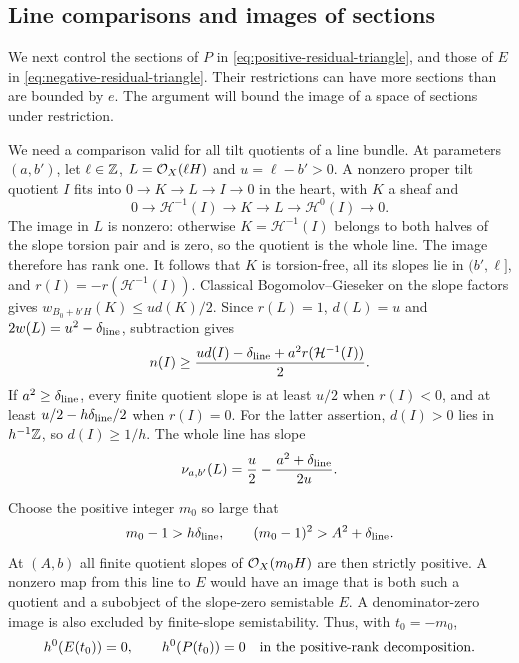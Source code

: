 \subsection{Line comparisons and images of sections}

We next control the sections of $P$ in
\eqref{eq:positive-residual-triangle}, and those of $E$ in
\eqref{eq:negative-residual-triangle}.  Their restrictions can have
more sections than are bounded by $e$.  The argument will bound the
image of a space of sections under restriction.

We need a comparison valid for all tilt quotients of a line bundle.
At parameters $(a,b')$, let $\ell\in\mathbb Z$, $L=\mathcal O_X(\ell H)$ and
$u=\ell-b'>0$.  A nonzero proper tilt quotient $I$ fits into
$0\to K\to L\to I\to0$ in the heart, with $K$ a sheaf and
\[
 0\longrightarrow\mathcal H^{-1}(I)\longrightarrow K
 \longrightarrow L\longrightarrow\mathcal H^0(I)\longrightarrow0.
\]
The image in $L$ is nonzero: otherwise $K=\mathcal H^{-1}(I)$
belongs to both halves of the slope torsion pair and is zero, so
the quotient is the whole line.  The image therefore has rank one.
It follows that $K$ is torsion-free, all its slopes lie in $(b',\ell]$,
and $r(I)=-r(\mathcal H^{-1}(I))$.  Classical Bogomolov--Gieseker
on the slope factors gives $w_{B_0+b'H}(K)\leq u d(K)/2$.
Since $r(L)=1$, $d(L)=u$ and
$2w(L)=u^2-\delta_{\rm line}$, subtraction gives
\begin{equation}\label{eq:line-quotient-numerator}
 n(I)\geq\frac{u d(I)-\delta_{\rm line}
                    +a^2r(\mathcal H^{-1}(I))}{2}.
\end{equation}
If $a^2\geq\delta_{\rm line}$, every finite quotient slope is at
least $u/2$ when $r(I)<0$, and at least
$u/2-h\delta_{\rm line}/2$ when $r(I)=0$.
For the latter assertion, $d(I)>0$ lies in $h^{-1}\mathbb Z$, so
$d(I)\geq1/h$.  The whole line has slope
\begin{equation}\label{eq:line-whole-slope}
 \nu_{a,b'}(L)=\frac u2-\frac{a^2+\delta_{\rm line}}{2u}.
\end{equation}

Choose the positive integer $m_0$ so large that
\[
 m_0-1>h\delta_{\rm line},\qquad
 (m_0-1)^2>A^2+\delta_{\rm line}.
\]
At $(A,b)$ all finite quotient slopes of $\mathcal O_X(m_0H)$ are then
strictly positive.  A nonzero map from this line to $E$ would have
an image that is both such a quotient and a subobject of the
slope-zero semistable $E$.  A denominator-zero image is also
excluded by finite-slope semistability.  Thus, with $t_0=-m_0$,
\begin{equation}\label{eq:initial-section-vanishing}
 h^0(E(t_0))=0,\qquad
 h^0(P(t_0))=0\quad\hbox{in the positive-rank decomposition}.
\end{equation}

